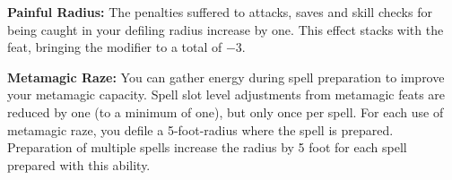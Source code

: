 {\textbf{Painful Radius:} The penalties suffered to attacks, saves and skill checks for being caught in your defiling radius increase by one. This effect stacks with the  feat, bringing the modifier to a total of $-3$.

\textbf{Metamagic Raze:} You can gather energy during spell preparation to improve your metamagic capacity. Spell slot level adjustments from metamagic feats are reduced by one (to a minimum of one), but only once per spell. For each use of metamagic raze, you defile a 5-foot-radius where the spell is prepared. Preparation of multiple spells increase the radius by 5 foot for each spell prepared with this ability.





}
